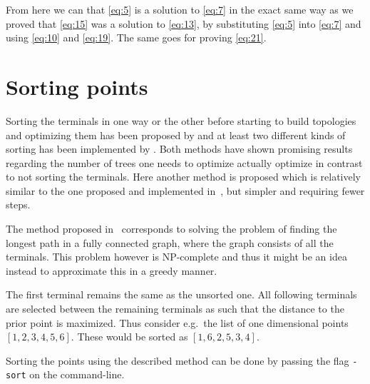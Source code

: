 %
From here we can that \cref{eq:5} is a solution to \cref{eq:7} in the exact same way as
we proved that \cref{eq:15} was a solution to \cref{eq:13}, by substituting
\cref{eq:5} into \cref{eq:7} and using \cref{eq:10} and \cref{eq:19}. The same
goes for proving \cref{eq:21}.

\section{Sorting points}
\label{sec:sorting-points}

Sorting the terminals in one way or the other before starting to build
topologies and optimizing them has been proposed by \textcite{smith1992} and at
least two different kinds of sorting has been implemented by
\textcite{fonseca2014,vanlaarhoven2013}. Both methods have shown promising
results regarding the number of trees one needs to optimize actually optimize in
contrast to not sorting the terminals. Here another method is
proposed which is relatively similar to the one proposed and implemented
in~\cite{fonseca2014}, but simpler and requiring fewer steps.

The method proposed in~\cite{fonseca2014} corresponds to solving the problem of
finding the longest path in a fully connected graph, where the graph consists of
all the terminals. This problem however is NP-complete\missingref{} and thus
it might be an idea instead to approximate this in a greedy manner.

The first terminal remains the same as the unsorted one. All following terminals
are selected between the remaining terminals as such that the distance to the
prior point is maximized. Thus consider e.g.\ the list of one dimensional points
$[1, 2, 3, 4, 5, 6]$. These would be sorted as $[1, 6, 2, 5, 3, 4]$.

Sorting the points using the described method can be done by passing the flag
\texttt{-sort} on the command-line.

\chapterbreak{}

